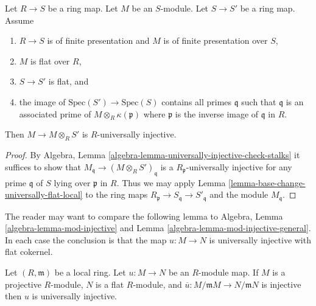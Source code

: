 \begin{lemma}
\label{lemma-base-change-universally-flat}
Let $R \to S$ be a ring map.
Let $M$ be an $S$-module.
Let $S \to S'$ be a ring map.
Assume
\begin{enumerate}
\item $R \to S$ is of finite presentation and $M$ is of finite presentation
over $S$,
\item $M$ is flat over $R$,
\item $S \to S'$ is flat, and
\item the image of $\text{Spec}(S') \to \text{Spec}(S)$ contains
all primes $\mathfrak q$ such that $\mathfrak q$ is an associated prime
of $M \otimes_R \kappa(\mathfrak p)$ where $\mathfrak p$ is the inverse
image of $\mathfrak q$ in $R$.
\end{enumerate}
Then $M \to M \otimes_R S'$ is $R$-universally injective.
\end{lemma}

\begin{proof}
By
Algebra, Lemma \ref{algebra-lemma-universally-injective-check-stalks}
it suffices to show that $M_{\mathfrak q} \to (M \otimes_R S')_{\mathfrak q}$
is a $R_{\mathfrak p}$-universally injective for any prime $\mathfrak q$
of $S$ lying over $\mathfrak p$ in $R$. Thus we may apply
Lemma \ref{lemma-base-change-universally-flat-local}
to the ring maps
$R_{\mathfrak p} \to S_{\mathfrak q} \to S'_{\mathfrak q}$
and the module $M_{\mathfrak q}$.
\end{proof}

\noindent
The reader may want to compare the following lemma to
Algebra, Lemma \ref{algebra-lemma-mod-injective} and
Lemma \ref{algebra-lemma-mod-injective-general}.
In each case the conclusion is that the map $u : M \to N$ is
universally injective with flat cokernel.

\begin{lemma}
\label{lemma-universally-injective-local}
Let $(R, \mathfrak m)$ be a local ring. Let $u : M \to N$ be an $R$-module map.
If $M$ is a projective $R$-module, $N$ is a flat $R$-module, and
$\overline{u} : M/\mathfrak mM \to N/\mathfrak mN$ is injective
then $u$ is universally injective.
\end{lemma}

